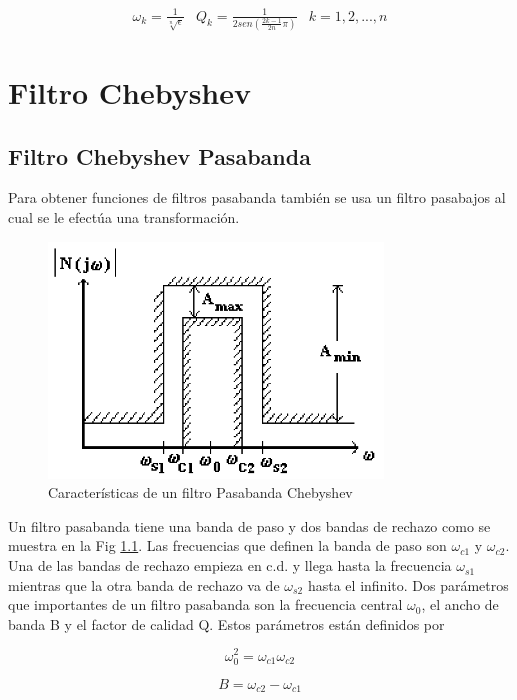\documentclass[12pt]{book}
\theoremstyle{definition}
\theoremstyle{remark}
\theoremstyle{plain}
\begin{document}
\begin{eqnarray}
\omega _k = \frac{1}{\sqrt[n]{\epsilon}} & Q_k = \frac{1}{2 sen (\frac{2k-1}{2n}\pi)} & k=1,2,...,n
\end{eqnarray}


\chapter{Filtro Chebyshev}

\section{Filtro Chebyshev Pasabanda}

Para obtener funciones de filtros pasabanda también se usa un filtro pasabajos al cual se le efectúa una transformación. 

\begin{figure}
\centering
\includegraphics[width=3.5in]{PasabandaCheby.png}
\caption{Características de un filtro Pasabanda Chebyshev}
\label{fig11}
\end{figure}


Un filtro pasabanda tiene una banda de paso y dos bandas de rechazo como se muestra en la Fig \ref{fig11}. Las frecuencias que definen la banda de paso son
$\omega _{c1}$ y $\omega _{c2}$. Una de las bandas de rechazo empieza en c.d. y llega hasta la frecuencia $\omega _{s1}$ mientras que la otra banda de rechazo va de
$\omega _{s2}$ hasta el infinito. Dos parámetros que importantes de un filtro pasabanda son la frecuencia central $\omega _0$, el ancho de banda B y el factor de 
calidad Q. Estos parámetros están definidos por

\begin{equation}
 \omega _0 ^2 = \omega _{c1}\omega _{c2}
\label{equ300}
\end{equation}

\begin{equation}
 B = \omega _{c2}- \omega _{c1}
\label{equ301}
\end{equation}
\end{document}
